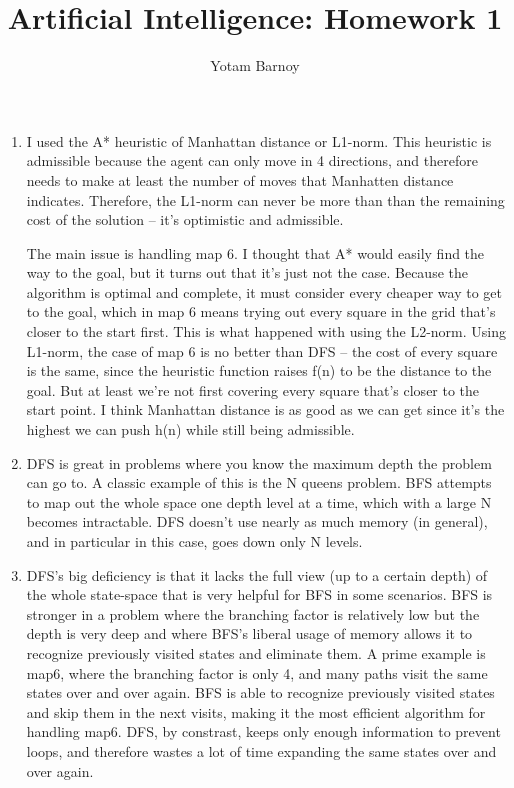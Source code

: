 \documentclass[11pt]{article}
\title{Artificial Intelligence: Homework 1}
\author{Yotam Barnoy}
\date{}
\begin{document}
\large
\maketitle
\thispagestyle{headings}

\vspace{-.5in}

\begin{enumerate}

\item I used the A* heuristic of Manhattan distance or L1-norm. This heuristic is admissible because the agent can only move in 4 directions, and therefore needs to make at least the number of moves that Manhatten distance indicates. Therefore, the L1-norm can never be more than than the remaining cost of the solution -- it's optimistic and admissible. 

The main issue is handling map 6. I thought that A* would easily find the way to the goal, but it turns out that it's just not the case. Because the algorithm is optimal and complete, it must consider every cheaper way to get to the goal, which in map 6 means trying out every square in the grid that's closer to the start first. This is what happened with using the L2-norm. Using L1-norm, the case of map 6 is no better than DFS -- the cost of every square is the same, since the heuristic function raises f(n) to be the distance to the goal. But at least we're not first covering every square that's closer to the start point. I think Manhattan distance is as good as we can get since it's the highest we can push h(n) while still being admissible.

\item DFS is great in problems where you know the maximum depth the problem can go to. A classic example of this is the N queens problem. BFS attempts to map out the whole space one depth level at a time, which with a large N becomes intractable. DFS doesn't use nearly as much memory (in general), and in particular in this case, goes down only N levels.

\item DFS's big deficiency is that it lacks the full view (up to a certain depth) of the whole state-space that is very helpful for BFS in some scenarios. BFS is stronger in a problem where the branching factor is relatively low but the depth is very deep and where BFS's liberal usage of memory allows it to recognize previously visited states and eliminate them. A prime example is map6, where the branching factor is only 4, and many paths visit the same states over and over again. BFS is able to recognize previously visited states and skip them in the next visits, making it the most efficient algorithm for handling map6. DFS, by constrast, keeps only enough information to prevent loops, and therefore wastes a lot of time expanding the same states over and over again.


\end{enumerate}
\end{document}
